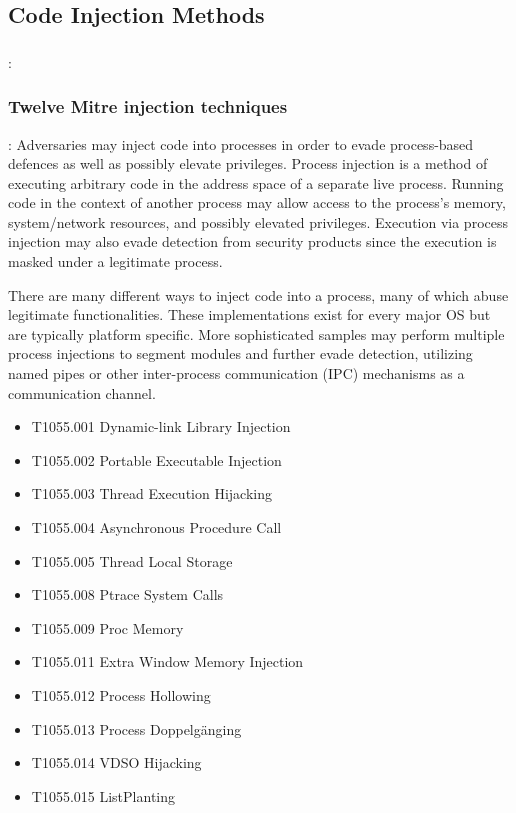 \documentclass{article}
\begin{document}
\subsection{Code Injection Methods}

\subsubsection{\textcite{Oosthoek:2019}}
\textbf{}: 


\subsubsection{\textcite{Mitre:2017} Twelve Mitre injection techniques}
\textbf{}: Adversaries may inject code into processes in order to evade process-based defences as well as possibly elevate privileges. Process injection is a method of executing arbitrary code in the address space of a separate live process. Running code in the context of another process may allow access to the process's memory, system/network resources, and possibly elevated privileges. Execution via process injection may also evade detection from security products since the execution is masked under a legitimate process. 

There are many different ways to inject code into a process, many of which abuse legitimate functionalities. These implementations exist for every major OS but are typically platform specific. 
More sophisticated samples may perform multiple process injections to segment modules and further evade detection, utilizing named pipes or other inter-process communication (IPC) mechanisms as a communication channel. 

\begin{itemize}
\item T1055.001	Dynamic-link Library Injection
\item T1055.002	Portable Executable Injection
\item T1055.003	Thread Execution Hijacking
\item T1055.004	Asynchronous Procedure Call
\item T1055.005	Thread Local Storage
\item T1055.008	Ptrace System Calls
\item T1055.009	Proc Memory
\item T1055.011	Extra Window Memory Injection
\item T1055.012	Process Hollowing
\item T1055.013	Process Doppelgänging
\item T1055.014	VDSO Hijacking
\item T1055.015	ListPlanting
\end{itemize}
\end{document}
